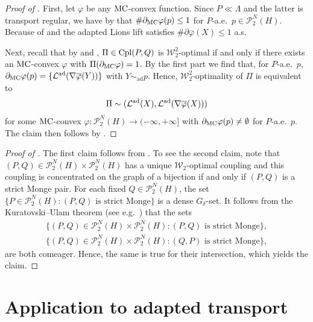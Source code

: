 \documentclass[a4paper]{amsart}
\numberwithin{theorem}{section}
\theoremstyle{definition}
\newcommand{\law}{\mathcal{L}}
\newcommand{\cpl}{\textup{Cpl}}
\newcommand{\W}{\mathcal{W}}
\newcommand{\Pc}{\mathcal P}
\newcommand{\simad}{\sim_{\mathrm{ad}}}
\renewcommand{\phi}{\varphi}
\newcommand{\mc}{\textup{MC}}
\newcommand{\lawad}{\law^{\textup{ad}}}
\begin{document}
\begin{proof}[Proof of ]
    First, let $\phi$ be any $\mc$-convex function.
    Since $P \ll \Lambda$ and the latter is transport regular, we have by  that $\# \partial_\mc \phi(p) \le 1$ for $P$-a.e.\ $p \in \Pc_2^{N}(H)$.
    Because of  and  the adapted Lions lift satisfies $\# \partial \overline\phi(X) \le 1$ a.s.

    Next, recall that by  and , $\Pi \in \cpl(P,Q)$ is $\W_2^2$-optimal if and only if there exists an $\mc$-convex $\phi$ with $\Pi(\partial_\mc \phi) = 1$.
    By the first part we find that, for $P$-a.e.\ $p$, $\partial_\mc \phi(p) = \{ \lawad(\nabla \overline\phi(Y)) \}$ with $Y \simad p$.
    Hence, $\W_2^2$-optimality of $\Pi$ is equivalent to
    \[
        \Pi \sim (\lawad(X), \lawad(\nabla \overline\phi(X)))
    \]
    for some $\mc$-convex $\phi : \Pc_2^N(H) \to (-\infty,+\infty]$ with $\partial_\mc \phi(p) \neq \emptyset$ for $P$-a.e.\ $p$.
    The claim then follows by .
\end{proof}

\begin{proof}[Proof of ]
    The first claim follows from .
    To see the second claim, note that $(P,Q) \in \Pc_2^N(H) \times \Pc_2^N(H)$ has a unique $\W_2$-optimal coupling and this coupling is concentrated on the graph of a bijection if and only if $(P,Q)$ is a strict Monge pair.
    For each fixed $Q \in \Pc_2^N(H)$, the set $\{ P \in  \Pc_2^N(H) : (P,Q) \text{ is strict Monge} \}$ is a dense $G_\delta$-set.
    It follows from the Kuratovski--Ulam theorem (see e.g.\ \cite[Theorem~8.41]{Ke95}) that the sets
    \begin{align*}
        \{ (P,Q) \in  \Pc_2^N(H) \times \Pc_2^N(H) : (P,Q) \text{ is strict Monge} \},\\
        \{ (P,Q) \in  \Pc_2^N(H) \times \Pc_2^N(H) : (Q,P) \text{ is strict Monge} \},
    \end{align*}
    are both comeager. Hence, the same is true for their intersection, which yields the claim.
\end{proof}




\section{Application to adapted transport}\label{sec:AW}
\end{document}
